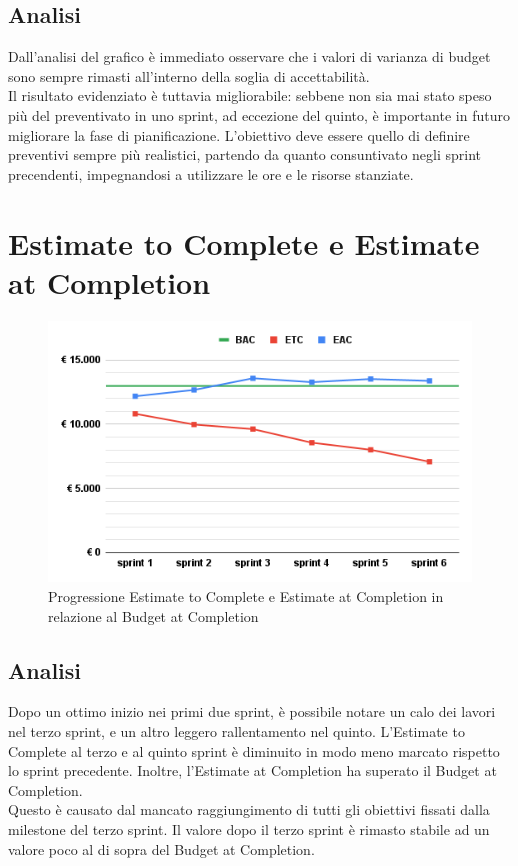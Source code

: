 \subsection{Analisi}
Dall'analisi del grafico è immediato osservare che i valori di varianza di budget sono sempre rimasti all'interno della soglia di accettabilità.\\
Il risultato evidenziato è tuttavia migliorabile: sebbene non sia mai stato speso più del preventivato in uno sprint, ad eccezione del quinto, è importante in futuro migliorare la fase di pianificazione. L'obiettivo deve essere quello di definire preventivi sempre più realistici, partendo da quanto consuntivato negli sprint precendenti, impegnandosi a utilizzare le ore e le risorse stanziate.

\section{Estimate to Complete e Estimate at Completion}
\begin{figure}[H]
    \centering
    \includegraphics[width=0.8\linewidth]{ETCEAC.png}
    \caption{Progressione Estimate to Complete e Estimate at Completion in relazione al Budget at Completion}
\end{figure}
\subsection{Analisi}
Dopo un ottimo inizio nei primi due sprint, è possibile notare un calo dei lavori nel terzo sprint, e un altro leggero rallentamento nel quinto. L'Estimate to Complete al terzo e al quinto sprint è diminuito in modo meno marcato rispetto lo sprint precedente. Inoltre, l'Estimate at Completion ha superato il Budget at Completion.\\
Questo è causato dal mancato raggiungimento di tutti gli obiettivi fissati dalla milestone del terzo sprint. Il valore dopo il terzo sprint è rimasto stabile ad un valore poco al di sopra del Budget at Completion.

